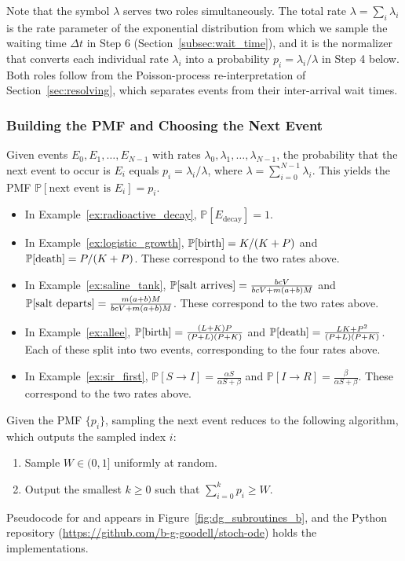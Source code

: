 Note that the symbol $\lambda$ serves two roles simultaneously. The total rate $\lambda = \sum_i \lambda_i$ is the rate parameter of the exponential distribution from which we sample the waiting time $\Delta t$ in Step 6 (Section~\ref{subsec:wait_time}), and it is the normalizer that converts each individual rate $\lambda_i$ into a probability $p_i = \lambda_i/\lambda$ in Step 4 below. Both roles follow from the Poisson-process re-interpretation of Section~\ref{sec:resolving}, which separates events from their inter-arrival wait times.

\subsubsection{Building the PMF and Choosing the Next Event}\label{subsubsec:construct_pmf}

Given events $E_0, E_1, \ldots, E_{N-1}$ with rates $\lambda_0, \lambda_1, \ldots, \lambda_{N-1}$, the probability that the next event to occur is $E_i$ equals $p_i = \lambda_i/\lambda$, where $\lambda = \sum_{i=0}^{N-1}\lambda_i$. This yields the PMF $\mathbb{P}[\text{next event is }E_i] = p_i$.
\begin{itemize}
\item In Example~\ref{ex:radioactive_decay}, $\mathbb{P}[E_{\mathrm{decay}}] = 1$.

\item In Example~\ref{ex:logistic_growth}, $\mathbb{P}[\textup{birth}] = K/(K+P)$ and $\mathbb{P}[\textup{death}] = P/(K+P)$. These correspond to the two rates above.

\item In Example~\ref{ex:saline_tank}, $\mathbb{P}[\textup{salt arrives}] = \frac{bcV}{bcV+m(a+b)M}$ and $\mathbb{P}[\textup{salt departs}] = \frac{m(a+b)M}{bcV+m(a+b)M}$. These correspond to the two rates above.

\item In Example~\ref{ex:allee}, $\mathbb{P}[\textup{birth}] = \frac{(L+K)P}{(P+L)(P+K)}$ and $\mathbb{P}[\textup{death}] = \frac{LK+P^2}{(P+L)(P+K)}$. Each of these split into two events, corresponding to the four rates above.

\item In Example~\ref{ex:sir_first}, $\mathbb{P}[S\to I] = \frac{\alpha S}{\alpha S+\beta}$ and $\mathbb{P}[I\to R] = \frac{\beta}{\alpha S+\beta}$. These correspond to the two rates above.
\end{itemize}

Given the PMF $\{p_i\}$, sampling the next event reduces to the following algorithm, which outputs the sampled index $i$:
\begin{enumerate}
\item Sample $W \in (0, 1]$ uniformly at random.
\item Output the smallest $k \geq 0$ such that $\sum_{i=0}^k p_i \geq W$.
\end{enumerate}
Pseudocode for \RatesToPmf{} and \PmfToEventIndex{} appears in Figure~\ref{fig:dg_subroutines_b}, and the Python repository (\url{https://github.com/b-g-goodell/stoch-ode}) holds the implementations.
